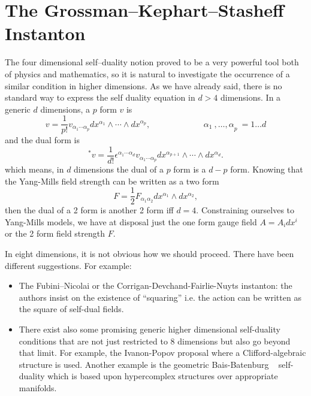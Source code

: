 \documentclass[a4paper,12pt]{book}
\begin{document}
\section{The Grossman--Kephart--Stasheff Instanton}

The four dimensional self--duality notion proved to be a very powerful tool
both of physics and mathematics, so it is natural to investigate the
occurrence of a similar condition in higher dimensions. As we have already
said, there is no standard way to express the self duality equation in $d>4$
dimensions. In a generic $d$ dimensions, a $p$ form $v$ is 
\begin{equation}
v=\frac{1}{p!}v_{\alpha _{1}\cdots \alpha _{p}}dx^{\alpha _{1}}\wedge \cdots
\wedge dx^{\alpha _{p}},\;\;\;\;\;\;\;\;\;\;\;\;\;\;\;\;\;\;\;\;\;\;{\
\alpha }_{1}{\ ,\ldots ,\alpha }_{p}{\ =1\ldots d}
\end{equation}
and the dual form is 
\begin{equation}
^{\ast }v=\frac{1}{d!}\epsilon ^{\alpha _{1}\cdots \alpha _{d}}v_{\alpha
_{1}\cdots \alpha _{p}}dx^{\alpha _{p+1}}\wedge \cdots \wedge dx^{\alpha
_{d}}.
\end{equation}
which means, in $d$ dimensions the dual of a $p$ form is a $d-p$ form.
Knowing that the Yang-Mills field strength can be written as a two form 
\begin{equation}
F=\frac{1}{2}F_{\alpha _{1}\alpha _{2}}dx^{\alpha _{1}}\wedge dx^{\alpha
_{2}},
\end{equation}
then the dual of a 2 form is another 2 form iff $d=4$. Constraining
ourselves to Yang-Mills models, we have at disposal just the one form gauge
field $A=A_{i}dx^{i}$ or the 2 form field strength $F.$

In eight dimensions, it is not obvious how we should proceed. There have
been different suggestions. For example:

\begin{itemize}
\item  The Fubini--Nicolai \cite{fub} or the Corrigan-Devchand-Fairlie-Nuyts 
\cite{cdfn} instanton: the authors insist on the existence of ``squaring''
i.e. the action can be written as the square of self-dual fields.

\item  There exist also some promising generic higher dimensional
self-duality conditions that are not just restricted to 8 dimensions but
also go beyond that limit. For example, the Ivanon-Popov \cite{IP} proposal
where a Clifford-algebraic structure is used. Another example is the
geometric Bais-Batenburg \ \cite{bb} self-duality which is based upon
hypercomplex structures over appropriate manifolds.
\end{itemize}
\end{document}
